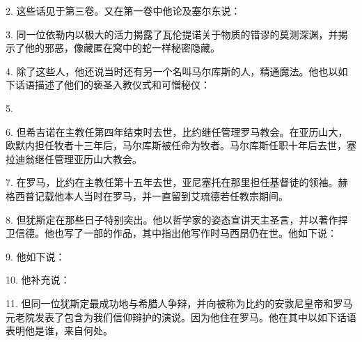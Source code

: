 2. 这些话见于第三卷。又在第一卷中他论及塞尔东说：\par

3. 同一位依勒内以极大的活力揭露了瓦伦提诺关于物质的错谬的莫测深渊，并揭示了他的邪恶，像藏匿在窝中的蛇一样秘密隐藏。\par

4. 除了这些人，他还说当时还有另一个名叫马尔库斯的人，精通魔法。他也以如下话语描述了他们的亵圣入教仪式和可憎秘仪：\par

5. \par

6. 但希吉诺在主教任第四年结束时去世，比约继任管理罗马教会。在亚历山大，欧默内担任牧者十三年后，马尔库斯被任命为牧者。马尔库斯任职十年后去世，塞拉迪翁继任管理亚历山大教会。\par

7. 在罗马，比约在主教任第十五年去世，亚尼塞托在那里担任基督徒的领袖。赫格西普记载他本人当时在罗马，并一直留到艾琉德若任教宗期间。\par

8. 但犹斯定在那些日子特别突出。他以哲学家的姿态宣讲天主圣言，并以著作捍卫信德。他也写了一部的作品，其中指出他写作时马西昂仍在世。他如下说：\par

9. 他如下说：\par

10. 他补充说：\par

11. 但同一位犹斯定最成功地与希腊人争辩，并向被称为比约的安敦尼皇帝和罗马元老院发表了包含为我们信仰辩护的演说。因为他住在罗马。他在其中以如下话语表明他是谁，来自何处。\par

